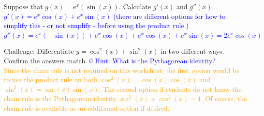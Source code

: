 \documentclass{ximera}
\begin{document}
\begin{exercise}
    Suppose that $g(x)=e^x(\sin(x))$.  Calculate $g'(x)$ and $g''(x)$. \\
    \textcolor{blue}{ $g'(x)=e^x\cos(x)+e^x\sin(x)$ (there are different options for how to simplify this - or not simplify - before using the product rule.)\\
    $g''(x)=e^x(-\sin(x))+e^x\cos(x)+e^x\cos(x)+e^x\sin(x)=2e^x\cos(x)$}
\end{exercise}  
   

\begin{exercise}
    Challenge: Differentiate $y=\cos^2(x)+\sin^2(x)$ in two different ways.  Confirm the answers match. \textcolor{blue}{ $0$ Hint: What is the Pythagorean identity? }\\
    \textcolor{orange}{Since the chain rule is not required on this worksheet, the first option would be to use the product rule on both $\cos^2(x)=\cos(x)\cos(x)$ and $\sin^2(x)=\sin(x)\sin(x)$.  The second option if students do not know the chain rule is the Pythagorean identity $\sin^2(x)+\cos^2(x)=1$.  Of course, the chain rule is available as an additional option if desired.}
\end{exercise}
\end{document}
